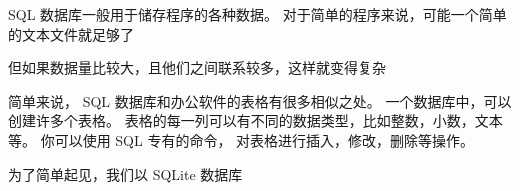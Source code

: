 
SQL 数据库一般用于储存程序的各种数据。 对于简单的程序来说，可能一个简单的文本文件就足够了

但如果数据量比较大，且他们之间联系较多，这样就变得复杂

简单来说， SQL 数据库和办公软件的表格有很多相似之处。 一个数据库中，可以创建许多个表格。 表格的每一列可以有不同的数据类型，比如整数，小数，文本等。 你可以使用 SQL 专有的命令， 对表格进行插入，修改，删除等操作。

为了简单起见，我们以 SQLite 数据库

